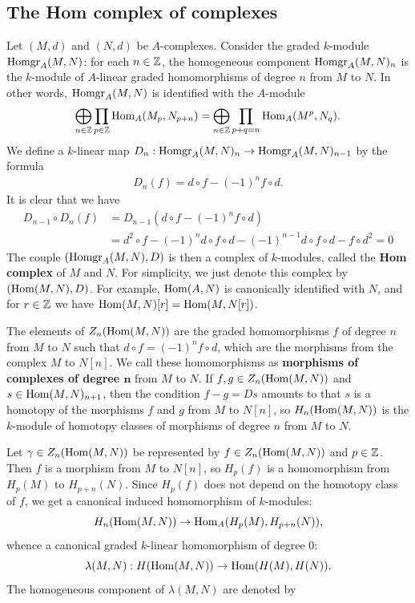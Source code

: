 \subsection{The Hom complex of complexes}
Let $(M,d)$ and $(N,d)$ be $A$-complexes. Consider the graded $k$-module $\mathrm{Homgr}_A(M,N)$: for each $n\in\mathbb{Z}$, the homogeneous component $\mathrm{Homgr}_A(M,N)_n$ is the $k$-module of $A$-linear graded homomorphisms of degree $n$ from $M$ to $N$. In other words, $\mathrm{Homgr}_A(M,N)$ is identified with the $A$-module
\[\bigoplus_{n\in\mathbb{Z}}\prod_{p\in\mathbb{Z}}\mathrm{Hom}_A(M_p,N_{p+n})=\bigoplus_{n\in\mathbb{Z}}\prod_{p+q=n}\mathrm{Hom}_A(M^p,N_q).\]
We define a $k$-linear map $D_n:\mathrm{Homgr}_A(M,N)_n\to\mathrm{Homgr}_A(M,N)_{n-1}$ by the formula
\begin{align}\label{module Hom complex differential def}
D_n(f)=d\circ f-(-1)^nf\circ d.
\end{align}
It is clear that we have
\begin{align*}
D_{n-1}\circ D_n(f)&=D_{n-1}(d\circ f-(-1)^nf\circ d)\\
&=d^2\circ f-(-1)^nd\circ f\circ d-(-1)^{n-1}d\circ f\circ d-f\circ d^2=0
\end{align*}
The couple $(\mathrm{Homgr}_A(M,N),D)$ is then a complex of $k$-modules, called the \textbf{Hom complex} of $M$ and $N$. For simplicity, we just denote this complex by $(\mathrm{Hom}(M,N),D)$. For example, $\mathrm{Hom}(A,N)$ is canonically identified with $N$, and for $r\in\mathbb{Z}$ we have $\mathrm{Hom}(M,N)[r]=\mathrm{Hom}(M,N[r])$.\par
The elements of $Z_n(\mathrm{Hom}(M,N))$ are the graded homomorphisms $f$ of degree $n$ from $M$ to $N$ such that $d\circ f=(-1)^nf\circ d$, which are the morphisms from the complex $M$ to $N[n]$. We call these homomorphisms as \textbf{morphisms of complexes of degree $\bm{n}$} from $M$ to $N$. If $f,g\in Z_n(\mathrm{Hom}(M,N))$ and $s\in\mathrm{Hom}(M,N)_{n+1}$, then the condition $f-g=Ds$ amounts to that $s$ is a homotopy of the morphisms $f$ and $g$ from $M$ to $N[n]$, so $H_n(\mathrm{Hom}(M,N))$ is the $k$-module of homotopy classes of morphisms of degree $n$ from $M$ to $N$.\par
Let $\gamma\in Z_n(\mathrm{Hom}(M,N))$ be represented by $f\in Z_n(\mathrm{Hom}(M,N))$ and $p\in\mathbb{Z}$. Then $f$ is a morphism from $M$ to $N[n]$, so $H_p(f)$ is a homomorphism from $H_p(M)$ to $H_{p+n}(N)$. Since $H_p(f)$ does not depend on the homotopy class of $f$, we get a canonical induced homomorphism of $k$-modules:
\[H_n(\mathrm{Hom}(M,N))\to\mathrm{Hom}_A(H_p(M),H_{p+n}(N)),\]
whence a canonical graded $k$-linear homomorphism of degree $0$:
\[\lambda(M,N):H(\mathrm{Hom}(M,N))\to\mathrm{Hom}(H(M),H(N)).\]
The homogeneous component of $\lambda(M,N)$ are denoted by
